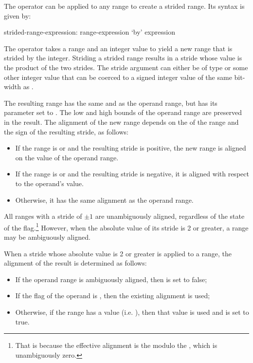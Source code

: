 The  operator can be applied to any range to create a strided
range.  Its syntax is given by:
\begin{syntax}
strided-range-expression:
  range-expression `by' expression
\end{syntax}

The  operator takes a range and an integer value to yield a
new range that is strided by the integer.  Striding a strided range
results in a stride whose value is the product of the two strides.
The stride argument can either be of type  or some other
integer value that can be coerced to a signed integer value of the same
bit-width as .  

The resulting range has the same  and  as the
operand range, but has its  parameter set to .
The low and high bounds of the operand range are preserved in the result.
The alignment of the new range depends on the  of the range
and the sign of the resulting stride, as follows:
\begin{itemize}
\item If the range is  or  and  the resulting stride is positive, the new range is aligned on
the  value of the operand range.  
\item If the range
is  or  and  the resulting stride is
negative, it is aligned with respect to the operand's  value.
\item Otherwise, it has the same alignment as the operand range.
\end{itemize}

All ranges with a stride of $\pm 1$ are unambiguously aligned, regardless of the
state of the  flag.\footnote{That is because the effective
alignment is the  modulo the , which is
unambiguously zero.}  However, when the absolute value of its stride is 2 or
greater, a range may be ambiguously aligned.

When a stride whose absolute value is 2 or greater is applied to a range, the
alignment of the result is determined as follows:
\begin{itemize}
\item If the operand range is ambiguously aligned, then  is set to
false;
\item If the  flag of the operand is , then the
existing alignment is used; 
\item Otherwise, if the range has a  value (i.e. 
), then that value is used and  is set
to true.
\end{itemize}

